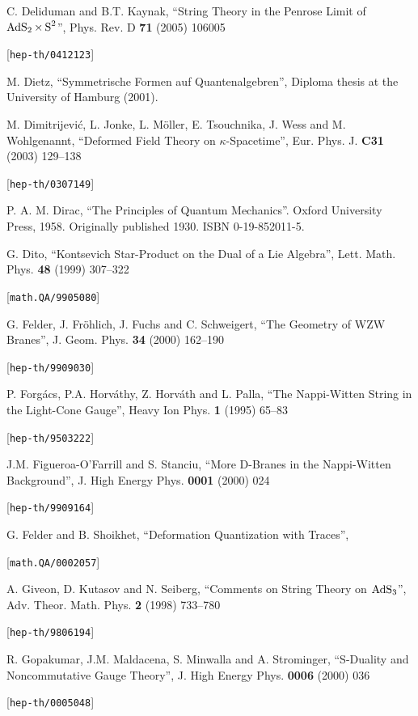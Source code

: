 \begin{thebibliography}{200}
 C. Deliduman and B.T. Kaynak, ``String Theory in the Penrose Limit of $\operatorname{AdS}_2\times\operatorname{S}^2$'', Phys. Rev. D {\bf 71} (2005) 106005 

 [{\tt hep-th/0412123}] 

 M. Dietz, ``Symmetrische Formen auf Quantenalgebren'', Diploma thesis at the University of Hamburg (2001). 

 M. Dimitrijevi\'c, L. Jonke, L. M\"oller, E. Tsouchnika, J. Wess and M. Wohlgenannt, ``Deformed Field Theory on $\kappa$-Spacetime'', Eur. Phys. J. {\bf C31} (2003) 129--138 

 [{\tt hep-th/0307149}] 

 P. A. M. Dirac, ``The Principles of Quantum Mechanics''. Oxford University Press, 1958. Originally published 1930. ISBN 0-19-852011-5. 

 G. Dito, ``Kontsevich Star-Product on the Dual of a Lie Algebra'', Lett. Math. Phys. {\bf 48} (1999) 307--322 

 [{\tt math.QA/9905080}] 

 G. Felder, J. Fr\"ohlich, J. Fuchs and C. Schweigert, ``The Geometry of WZW Branes'', J. Geom. Phys. {\bf 34} (2000) 162--190 

 [{\tt hep-th/9909030}] 

 P. Forg\'acs, P.A. Horv\'athy, Z. Horv\'ath and L. Palla, ``The Nappi-Witten String in the Light-Cone Gauge'', Heavy Ion Phys. {\bf 1} (1995) 65--83 

 [{\tt hep-th/9503222}] 

 J.M. Figueroa-O'Farrill and S. Stanciu, ``More D-Branes in the Nappi-Witten Background'', J. High Energy Phys. {\bf 0001} (2000) 024 

 [{\tt hep-th/9909164}] 

 G. Felder and B. Shoikhet, ``Deformation Quantization with Traces'', 

 [{\tt math.QA/0002057}] 

 A. Giveon, D. Kutasov and N. Seiberg, ``Comments on String Theory on $\operatorname{AdS}_3$'', Adv. Theor. Math. Phys. {\bf 2} (1998) 733--780 

 [{\tt hep-th/9806194}] 

 R. Gopakumar, J.M. Maldacena, S. Minwalla and A. Strominger, ``S-Duality and Noncommutative Gauge Theory'', J. High Energy Phys. {\bf 0006} (2000) 036 

 [{\tt hep-th/0005048}] 


\end{thebibliography}
